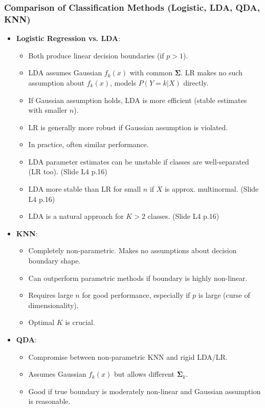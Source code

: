 \documentclass[12pt,a4paper]{article}
\begin{document}
\begin{itemize}
    \subsubsection{Comparison of Classification Methods (Logistic, LDA, QDA, KNN) }
        \begin{itemize}
            \item \textbf{Logistic Regression vs. LDA}:
                \begin{itemize}
                    \item Both produce linear decision boundaries (if $p>1$).
                    \item LDA assumes Gaussian $f_k(x)$ with common $\boldsymbol{\Sigma}$. LR makes no such assumption about $f_k(x)$, models $P(Y=k|X)$ directly.
                    \item If Gaussian assumption holds, LDA is more efficient (stable estimates with smaller $n$).
                    \item LR is generally more robust if Gaussian assumption is violated.
                    \item In practice, often similar performance.
                    \item LDA parameter estimates can be unstable if classes are well-separated (LR too). (Slide L4 p.16)
                    \item LDA more stable than LR for small $n$ if $X$ is approx. multinormal. (Slide L4 p.16)
                    \item LDA is a natural approach for $K>2$ classes. (Slide L4 p.16)
                \end{itemize}
            \item \textbf{KNN}:
                \begin{itemize}
                    \item Completely non-parametric. Makes no assumptions about decision boundary shape.
                    \item Can outperform parametric methods if boundary is highly non-linear.
                    \item Requires large $n$ for good performance, especially if $p$ is large (curse of dimensionality).
                    \item Optimal $K$ is crucial.
                \end{itemize}
            \item \textbf{QDA}:
                \begin{itemize}
                    \item Compromise between non-parametric KNN and rigid LDA/LR.
                    \item Assumes Gaussian $f_k(x)$ but allows different $\boldsymbol{\Sigma}_k$.
                    \item Good if true boundary is moderately non-linear and Gaussian assumption is reasonable.
                \end{itemize}
        \end{itemize}


\end{itemize}
\end{document}
